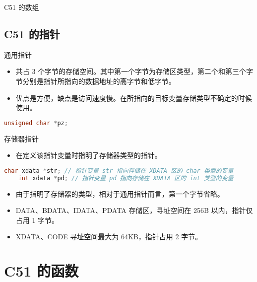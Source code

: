 \documentclass{beamer}
\begin{document}
\begin{frame}{C51 的数组}
\end{frame}

\subsection{C51 的指针}

\begin{frame}[fragile]{通用指针}
  \begin{itemize}
  
  \item
    共占 3
    个字节的存储空间。其中第一个字节为存储区类型，第二个和第三个字节分别是指针所指向的数据地址的高字节和低字节。
  \item
    优点是方便，缺点是访问速度慢。在所指向的目标变量存储类型不确定的时候使用。
  \end{itemize}

    \begin{lstlisting}[language=C]
    unsigned char *pz;
    \end{lstlisting}
\end{frame}

\begin{frame}[fragile]{存储器指针}
  \begin{itemize}
  
  \item
    在定义该指针变量时指明了存储器类型的指针。
  \end{itemize}

    \begin{lstlisting}[language=C]
    char xdata *str; // 指针变量 str 指向存储在 XDATA 区的 char 类型的变量
    int xdata *pd; // 指针变量 pd 指向存储在 XDATA 区的 int 类型的变量
    \end{lstlisting}

  \begin{itemize}
  
  \item
    由于指明了存储器的类型，相对于通用指针而言，第一个字节省略。
  \item
    DATA、BDATA、IDATA、PDATA 存储区，寻址空间在 256B 以内，指针仅占用 1
    字节。
  \item
    XDATA、CODE 寻址空间最大为 64KB，指针占用 2 字节。
  \end{itemize}

\end{frame}

\section{C51 的函数}
\end{document}
